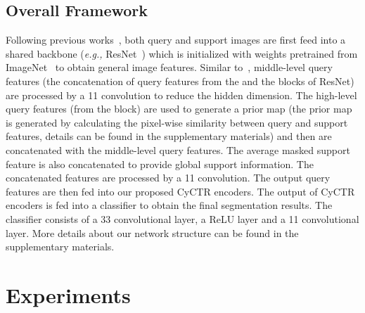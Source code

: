 \documentclass{article}
\begin{document}
\subsection{Overall Framework}
\label{sec:overall}
Following previous works~\cite{tian2020pfenet,wang2019panet,zhang2019canet}, both query and support images are first feed into a shared backbone (\textit{e.g.,} ResNet~\cite{he2015resnet}) which is initialized with weights pretrained from ImageNet~\cite{russakovsky2015imagenet} to obtain general image features. Similar to~\cite{tian2020pfenet}, middle-level query features (the concatenation of query features from the  and the  blocks of ResNet) are processed by a 11 convolution to reduce the hidden dimension. The high-level query features (from the  block) are used to generate a prior map (the prior map is generated by calculating the pixel-wise similarity between query and support features, details can be found in the supplementary materials) and then are concatenated with the middle-level query features. The average masked support feature is also concatenated to provide global support information. The concatenated features are processed by a 11 convolution. 
The output query features are then fed into our proposed CyCTR encoders. 
The output of CyCTR encoders is fed into a classifier to obtain the final segmentation results. The classifier consists of a 33 convolutional layer, a ReLU layer and a 11 convolutional layer. 
More details about our network structure can be found in the supplementary materials. 
\section{Experiments}
\label{sec:exp}
\end{document}
